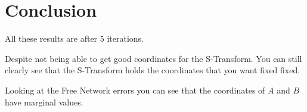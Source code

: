 \documentclass[11pt,a4paper]{article}
\begin{document}
	\newpage
	\section{Conclusion}
	All these results are after 5 iterations.
	
	Despite not being able to get good coordinates for the S-Transform. You can still clearly see that the S-Transform holds the coordinates that you want fixed fixed.
	
	Looking at the Free Network errors you can see that the coordinates of $A$ and $B$ have marginal values.
	
\end{document}
